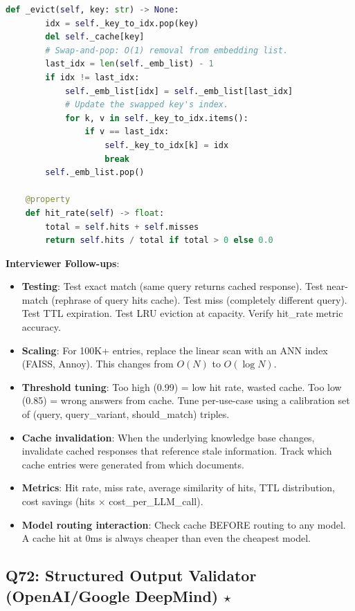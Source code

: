 \begin{lstlisting}[language=Python]
    def _evict(self, key: str) -> None:
        idx = self._key_to_idx.pop(key)
        del self._cache[key]
        # Swap-and-pop: O(1) removal from embedding list.
        last_idx = len(self._emb_list) - 1
        if idx != last_idx:
            self._emb_list[idx] = self._emb_list[last_idx]
            # Update the swapped key's index.
            for k, v in self._key_to_idx.items():
                if v == last_idx:
                    self._key_to_idx[k] = idx
                    break
        self._emb_list.pop()

    @property
    def hit_rate(self) -> float:
        total = self.hits + self.misses
        return self.hits / total if total > 0 else 0.0
\end{lstlisting}

\textbf{Interviewer Follow-ups}:
\begin{itemize}[leftmargin=*]
    \item \textbf{Testing}: Test exact match (same query returns cached response). Test near-match (rephrase of query hits cache). Test miss (completely different query). Test TTL expiration. Test LRU eviction at capacity. Verify hit\_rate metric accuracy.
    \item \textbf{Scaling}: For 100K+ entries, replace the linear scan with an ANN index (FAISS, Annoy). This changes  from $O(N)$ to $O(\log N)$.
    \item \textbf{Threshold tuning}: Too high (0.99) = low hit rate, wasted cache. Too low (0.85) = wrong answers from cache. Tune per-use-case using a calibration set of (query, query\_variant, should\_match) triples.
    \item \textbf{Cache invalidation}: When the underlying knowledge base changes, invalidate cached responses that reference stale information. Track which cache entries were generated from which documents.
    \item \textbf{Metrics}: Hit rate, miss rate, average similarity of hits, TTL distribution, cost savings (hits $\times$ cost\_per\_LLM\_call).
    \item \textbf{Model routing interaction}: Check cache BEFORE routing to any model. A cache hit at 0ms is always cheaper than even the cheapest model.
\end{itemize}

\subsection{Q72: Structured Output Validator (OpenAI/Google DeepMind) $\star$}

